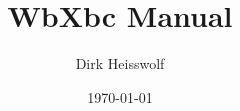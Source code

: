\documentclass{article}
\begin{document}
\newcommand{\secref}[2][Section]{\hyperref[{#2}]{\mbox{#1~\ref*{#2}} \mbox{``\nameref*{#2}``}}}
\newcommand{\tabref}[2][Table]{\hyperref[{#2}]{\mbox{#1~\ref*{#2}}}}
\newcommand{\figref}[2][Figure]{\hyperref[{#2}]{\mbox{#1~\ref*{#2}}}}

\title{WbXbc Manual}
\date{\today}
\author{Dirk Heisswolf}
\maketitle

\setcounter{tocdepth}{3}
\tableofcontents










%
%
%
%
%
%
%
%
%
%
%

%



\end{document}
